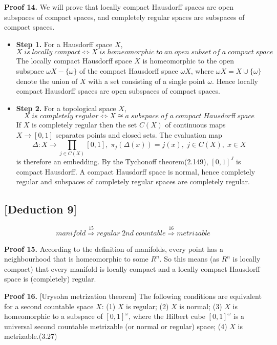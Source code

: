 \documentclass[11pt]{diazessay} %
\begin{document}
\vskip 10pt
\textbf{Proof 14.} We will prove that locally compact Hausdorff spaces are open subspaces of compact spaces, and completely
regular spaces are subspaces of compact spaces.

\begin{itemize}
	\item \textbf{Step 1.} For a Hausdorff space $X$,
	$$X \; is \; locally \; compact \iff X \; is \; homeomorphic \; to \; an \; open \; subset \; of \; a \; compact \; space$$
	The locally compact Hausdorff space $X$ is homeomorphic to the open subspace $\omega X - \{\omega\}$ of the compact Hausdorff space $\omega X$, where $\omega X = X \cup \{\omega\}$ denote the union of $X$ with a set consisting of a single point $\omega$.
	Hence locally compact Hausdorff spaces are open subspaces of compact spaces.

	\vskip 5pt
	\item \textbf{Step 2.} For a topological space $X$,
	$$X \; is \; completely \; regular \iff X \cong  a \; subspace \; of \; a \; compact \; Hausdorﬀ \; space$$
	If $X$ is completely regular then the set $C(X)$ of continuous maps $X \rightarrow [0, 1]$ separates points and closed sets. The evaluation map
	$$\Delta: X \rightarrow \textstyle{\prod_{j\in C(X)}}[0,1], \;\pi_j (\Delta(x)) = j(x),\; j \in C(X),\; x \in X$$
is therefore an embedding. By the Tychonoﬀ theorem\cite{1}(2.149), $[0, 1]^J$ is compact Hausdorﬀ. A compact Hausdorﬀ space is normal, hence completely regular and subspaces of completely regular spaces are completely regular.
\end{itemize}

\vskip 10pt
\subsection*{[Deduction 9]}
\vskip -10pt
\begin{equation}
	manifold \overset{15}{\Longrightarrow} regular \; 2nd \; countable \overset{16}{\Longrightarrow} metrizable
\end{equation}

\vskip 10pt
\textbf{Proof 15.} According to the definition of manifolds, every point has a neighbourhood that is homeomorphic to some $R^n$.
So this means (as $R^n$ is locally compact) that every manifold is locally compact
and a locally compact Hausdorff space is (completely) regular.

\vskip 10pt
\textbf{Proof 16.} [Urysohn metrization theorem] The following conditions are equivalent for a second
countable space $X$: (1) $X$ is regular; (2) $X$ is normal; (3) $X$ is homeomorphic to a subspace of $[0, 1]^\omega$, where the Hilbert cube $[0, 1]^\omega$ is a universal second countable metrizable (or normal or regular) space; (4) $X$ is metrizable.\cite{1}(3.27)
\end{document}
